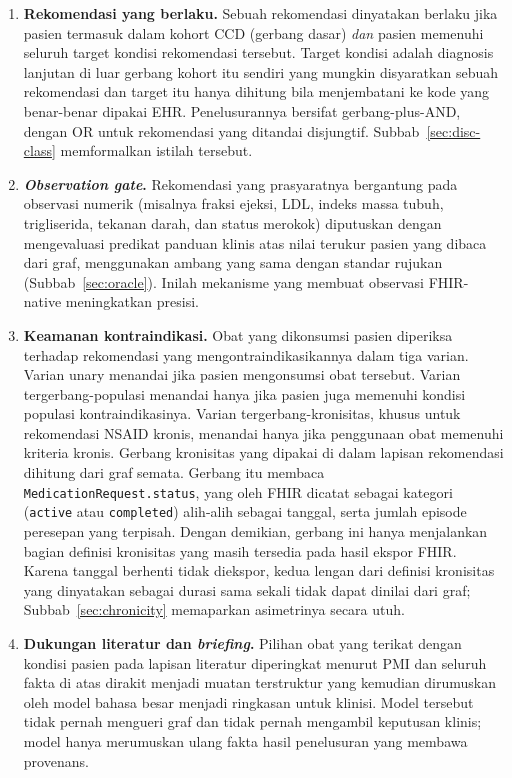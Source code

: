 \begin{enumerate}
    \item \textbf{Rekomendasi yang berlaku.} Sebuah rekomendasi dinyatakan berlaku jika pasien
    termasuk dalam kohort CCD (gerbang dasar) \emph{dan} pasien memenuhi seluruh target
    kondisi rekomendasi tersebut. Target kondisi adalah diagnosis lanjutan di luar gerbang
    kohort itu sendiri yang mungkin disyaratkan sebuah rekomendasi dan target itu hanya
    dihitung bila menjembatani ke kode yang benar-benar dipakai EHR. Penelusurannya bersifat
    gerbang-plus-AND, dengan OR untuk rekomendasi yang ditandai disjungtif. Subbab~\ref{sec:disc-class} memformalkan istilah
    tersebut.
    \item \textbf{\emph{Observation gate}.} Rekomendasi yang prasyaratnya bergantung pada
    observasi numerik (misalnya fraksi ejeksi, LDL, indeks massa tubuh, trigliserida, tekanan
    darah, dan status merokok) diputuskan dengan mengevaluasi predikat panduan klinis atas nilai
    terukur pasien yang dibaca dari graf, menggunakan ambang yang sama dengan standar rujukan
    (Subbab~\ref{sec:oracle}). Inilah mekanisme yang membuat observasi FHIR-native
    meningkatkan presisi.
    \item \textbf{Keamanan kontraindikasi.} Obat yang dikonsumsi pasien diperiksa terhadap
    rekomendasi yang mengontraindikasikannya dalam tiga varian. Varian unary menandai jika
    pasien mengonsumsi obat tersebut. Varian tergerbang-populasi menandai hanya jika pasien
    juga memenuhi kondisi populasi kontraindikasinya. Varian tergerbang-kronisitas, khusus
    untuk rekomendasi NSAID kronis, menandai hanya jika penggunaan obat memenuhi kriteria kronis. Gerbang kronisitas yang
    dipakai di dalam lapisan rekomendasi dihitung dari graf semata. Gerbang itu membaca
    \texttt{MedicationRequest.status}, yang oleh FHIR dicatat sebagai kategori
    (\texttt{active} atau \texttt{completed}) alih-alih sebagai tanggal, serta jumlah
    episode peresepan yang terpisah. Dengan demikian, gerbang ini hanya menjalankan bagian
    definisi kronisitas yang masih tersedia pada hasil ekspor FHIR. Karena tanggal berhenti tidak
    diekspor, kedua lengan dari definisi kronisitas yang dinyatakan sebagai durasi sama sekali tidak dapat
    dinilai dari graf; Subbab~\ref{sec:chronicity} memaparkan asimetrinya secara utuh.
    \item \textbf{Dukungan literatur dan \emph{briefing}.} Pilihan obat yang terikat dengan
    kondisi pasien pada lapisan literatur diperingkat menurut PMI dan seluruh fakta di atas
    dirakit menjadi muatan terstruktur yang kemudian dirumuskan oleh model bahasa besar
    menjadi ringkasan untuk klinisi. Model tersebut tidak pernah mengueri graf dan tidak
    pernah mengambil keputusan klinis; model hanya merumuskan ulang fakta hasil penelusuran
    yang membawa provenans.
\end{enumerate}


